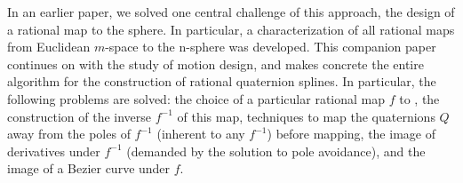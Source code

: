 \documentclass[11pt]{article}
\begin{document}
In an earlier paper, we solved one central challenge of this approach, 
the design of a rational map to the sphere.
In particular, a characterization of all rational maps from Euclidean $m$-space 
to the n-sphere was developed.
This companion paper continues on with the study of motion design,
and makes concrete the entire algorithm for the construction of rational 
quaternion splines.
In particular, the following problems are solved:
the choice of a particular rational map $f$ to ,
the construction of the inverse $f^{-1}$ of this map,
techniques to map the quaternions $Q$ away from the poles of $f^{-1}$ (inherent to any
$f^{-1}$) before mapping,
the image of derivatives under $f^{-1}$ (demanded by the solution to pole avoidance),
and the image of a Bezier curve under $f$.
\end{document}

